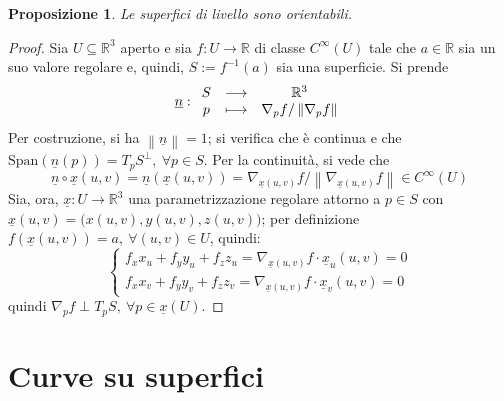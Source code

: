 \documentclass[12pt]{scrartcl}
\theoremstyle{style}
\newtheorem{prop}{Proposizione}[section]
\numberwithin{equation}{subsection}
\begin{document}
\begin{prop}
	Le superfici di livello sono orientabili.
\end{prop}
\begin{proof}
	Sia $U \subseteq \mathbb{R}^3$ aperto e sia $f:U\to \mathbb{R}$ di classe $C^\infty(U)$ tale che $a \in \mathbb{R}$ sia un suo valore regolare e, quindi, $S := f^{-1}(a)$ sia una superficie.
	Si prende 
	\[
	\underline{n}:
	\begin{array}
		{c c c}
		S &\longrightarrow& \mathbb{R}^3\\
		p & \longmapsto & \nabla _p f / \left\lVert \nabla _p f \right\rVert 
	\end{array}
	\] 
	Per costruzione, si ha $\left\lVert \underline{n} \right\rVert =1$; si verifica che \`e continua e che $\mathrm{Span} (\underline{n}(p)) = T_p S^\perp, \ \forall p \in S$.
	Per la continuit\`a, si vede che
	\[
	\underline{n}\circ \underline{x}(u,v) = \underline{n}(\underline{x}(u,v)) = \nabla _{\underline{x}(u,v)} f / \left\lVert \nabla _{\underline{x}(u,v)} f \right\rVert \in C^\infty(U)
	\] 
	Sia, ora, $\underline{x}:U\to \mathbb{R}^3 $ una parametrizzazione regolare attorno a $p \in S$ con $\underline{x}(u,v) = \big(x(u,v) , y(u,v) ,z(u,v)\big)$; per definizione $f(\underline{x}(u,v)) = a, \ \forall (u,v) \in U$, quindi:
	\[
		\begin{cases}
	f_x x_u + f_y y_u + f_z z_u = \nabla _{\underline{x}(u,v)} f \cdot \underline{x}_u(u,v) = 0\\
	f_x x_v + f_y y_v + f_z z_v = \nabla _{\underline{x}(u,v)} f \cdot \underline{x}_v(u,v) = 0
		\end{cases}
	\] 
	quindi $\nabla _p f \perp T_p S, \ \forall p \in \underline{x}(U)$.
\end{proof}
\newpage
\section{Curve su superfici}
\end{document}

